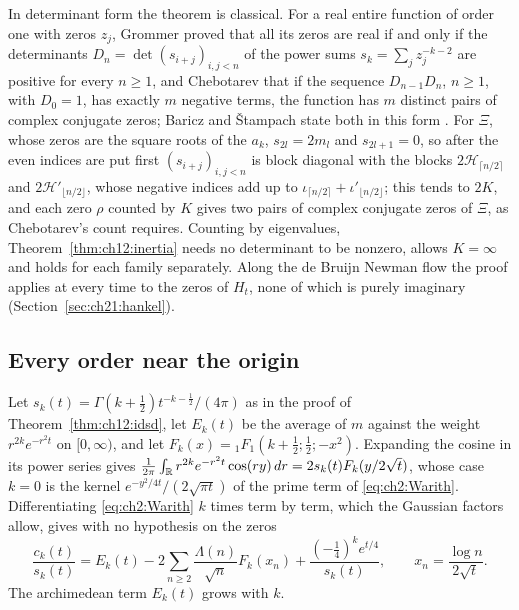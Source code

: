 In determinant form the theorem is classical. For a real entire function of order one with zeros $z_j$, Grommer \cite{Grommer14} proved that all its zeros are real if and only if the determinants $D_n=\det(s_{i+j})_{i,j<n}$ of the power sums $s_k=\sum_jz_j^{-k-2}$ are positive for every $n\ge1$, and Chebotarev \cite{Chebotarev28} that if the sequence $D_{n-1}D_n$, $n\ge1$, with $D_0=1$, has exactly $m$ negative terms, the function has $m$ distinct pairs of complex conjugate zeros; Baricz and \v{S}tampach state both in this form \cite[Theorem 10]{BS18}. For $\Xi$, whose zeros are the square roots of the $a_k$, $s_{2l}=2m_l$ and $s_{2l+1}=0$, so after the even indices are put first $(s_{i+j})_{i,j<n}$ is block diagonal with the blocks $2\mathcal H_{\lceil n/2\rceil}$ and $2\mathcal H'_{\lfloor n/2\rfloor}$, whose negative indices add up to $\iota_{\lceil n/2\rceil}+\iota'_{\lfloor n/2\rfloor}$; this tends to $2K$, and each zero $\rho$ counted by $K$ gives two pairs of complex conjugate zeros of $\Xi$, as Chebotarev's count requires. Counting by eigenvalues, Theorem~\ref{thm:ch12:inertia} needs no determinant to be nonzero, allows $K=\infty$ and holds for each family separately. Along the de Bruijn Newman flow the proof applies at every time to the zeros of $H_t$, none of which is purely imaginary (Section~\ref{sec:ch21:hankel}).

\subsection{Every order near the origin}\label{sec:ch12:allorders}

Let $s_k(t)=\Gamma(k+\frac12)t^{-k-\frac12}/(4\pi)$ as in the proof of Theorem~\ref{thm:ch12:idsd}, let $E_k(t)$ be the average of $m$ against the weight $r^{2k}e^{-r^2t}$ on $[0,\infty)$, and let $F_k(x)={}_1F_1(k+\frac12;\frac12;-x^2)$. Expanding the cosine in its power series gives $\frac1{2\pi}\int_{\mathbb{R}}r^{2k}e^{-r^2t}\cos(ry)\,dr=2s_k(t)F_k(y/2\sqrt t)$, whose case $k=0$ is the kernel $e^{-y^2/4t}/(2\sqrt{\pi t})$ of the prime term of \eqref{eq:ch2:Warith}. Differentiating \eqref{eq:ch2:Warith} $k$ times term by term, which the Gaussian factors allow, gives with no hypothesis on the zeros
\begin{equation}\label{eq:ch12:ckarith}
\frac{c_k(t)}{s_k(t)}=E_k(t)-2\sum_{n\ge2}\frac{\Lambda(n)}{\sqrt n}F_k(x_n)+\frac{(-\frac14)^ke^{t/4}}{s_k(t)},\qquad x_n=\frac{\log n}{2\sqrt t}.
\end{equation}
The archimedean term $E_k(t)$ grows with $k$.

